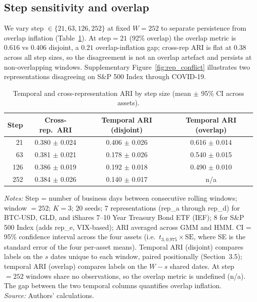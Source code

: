 \documentclass[preprint,12pt,authoryear]{elsarticle}
\newcommand{\SPX}{S\&P 500 Index}
\newcommand{\IEF}{iShares 7--10 Year Treasury Bond ETF (IEF)}
\begin{document}
\subsection{Step sensitivity and overlap}

We vary step $\in\{21, 63, 126, 252\}$ at fixed $W=252$ to separate persistence from overlap inflation (Table~\ref{tab:step_sensitivity}). At step$=21$ (92\% overlap) the overlap metric is $0.616$ vs $0.406$ disjoint, a $0.21$ overlap-inflation gap; cross-rep ARI is flat at $0.38$ across all step sizes, so the disagreement is not an overlap artefact and persists at non-overlapping windows. Supplementary Figure~\ref{fig:rep_conflict} illustrates two representations disagreeing on \SPX{} through COVID-19.

\begin{table}[!htbp]
\centering
\small
\setlength{\tabcolsep}{5pt}
\caption{Temporal and cross-representation ARI by step size (mean $\pm$ 95\% CI across assets).}
\label{tab:step_sensitivity}
\begin{tabular}{rccc}
\toprule
Step & Cross-rep.\ ARI & Temporal ARI (disjoint) & Temporal ARI (overlap) \\
\midrule
21 & 0.380 $\pm$ 0.024 & 0.406 $\pm$ 0.026 & 0.616 $\pm$ 0.014 \\
63 & 0.381 $\pm$ 0.021 & 0.178 $\pm$ 0.026 & 0.540 $\pm$ 0.015 \\
126 & 0.386 $\pm$ 0.019 & 0.192 $\pm$ 0.018 & 0.490 $\pm$ 0.010 \\
252 & 0.384 $\pm$ 0.026 & 0.140 $\pm$ 0.017 & n/a \\
\bottomrule
\end{tabular}
\medskip
\footnotesize
\textit{Notes:} Step = number of business days between consecutive rolling windows; window $=252$; $K=3$; 20 seeds; 7 representations (rep\_a through rep\_d) for BTC-USD, GLD, and \IEF{}; 8 for \SPX{} (adds rep\_e, VIX-based); ARI averaged across GMM and HMM. CI = 95\% confidence interval across the four assets (i.e.\ $t_{3,0.975} \times \text{SE}$, where SE is the standard error of the four per-asset means). Temporal ARI (disjoint) compares labels on the $s$ dates unique to each window, paired positionally (Section~3.5); temporal ARI (overlap) compares labels on the $W - s$ shared dates. At step $= 252$ windows share no observations, so the overlap metric is undefined (n/a). The gap between the two temporal columns quantifies overlap inflation. \\
\textit{Source:} Authors' calculations.
\end{table}
\end{document}
